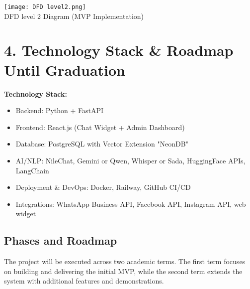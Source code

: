 \documentclass[12pt,a4paper]{article}
\begin{document}
\begin{center}
    \texttt{[image: DFD level2.png]}
    \\ DFD level 2 Diagram (MVP Implementation)
\end{center}

\newpage
\section*{4. Technology Stack \& Roadmap Until Graduation}
\textbf{Technology Stack:}
\begin{itemize}
    \item Backend: Python + FastAPI
    \item Frontend: React.js (Chat Widget + Admin Dashboard)
    \item Database: PostgreSQL with Vector Extension "NeonDB"
    \item AI/NLP: NileChat, Gemini or Qwen, Whisper or Sada, HuggingFace APIs, LangChain
    \item Deployment \& DevOps: Docker, Railway, GitHub CI/CD
    \item Integrations: WhatsApp Business API, Facebook API, Instagram API, web widget
\end{itemize}

\subsection{Phases and Roadmap}

The project will be executed across two academic terms.  
The first term focuses on building and delivering the initial MVP, while the second term extends the system with additional features and demonstrations.
\end{document}
